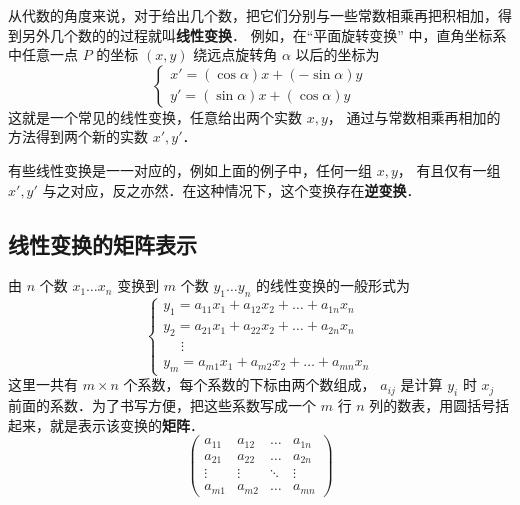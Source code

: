 

从代数的角度来说，对于给出几个数，把它们分别与一些常数相乘再把积相加，得到另外几个数的的过程就叫\textbf{线性变换}． 例如，在“平面旋转变换” 中，直角坐标系中任意一点 $P$ 的坐标 $(x,y)$ 绕远点旋转角 $\alpha $ 以后的坐标为
\begin{equation}\label{LTrans_eq1}
\begin{cases}
x' = (\cos\alpha) x + (-\sin\alpha)y\\
y' = (\sin \alpha)x + (\cos\alpha)y
\end{cases}
\end{equation}
这就是一个常见的线性变换，任意给出两个实数 $x,y$， 通过与常数相乘再相加的方法得到两个新的实数  $x',y'$． 

有些线性变换是一一对应的，例如上面的例子中，任何一组 $x,y$， 有且仅有一组 $x',y'$ 与之对应，反之亦然．在这种情况下，这个变换存在\textbf{逆变换}．

\subsection{线性变换的矩阵表示}

由 $n$ 个数 $x_1 \ldots x_n$ 变换到 $m$ 个数 $y_1 \ldots y_n$ 的线性变换的一般形式为
\begin{equation}
\begin{cases}
y_1 = a_{11} x_1 + a_{12} x_2 + \ldots + a_{1n} x_n\\
y_2 = a_{21} x_1 + a_{22} x_2 + \ldots + a_{2n} x_n\\
\quad\; \vdots \\
y_m = a_{m1} x_1 + a_{m2} x_2 + \ldots + a_{mn} x_n
\end{cases}
\end{equation} 
这里一共有 $m \times n$ 个系数，每个系数的下标由两个数组成， $a_{ij}$ 是计算 $y_i$ 时 $x_j$ 前面的系数．为了书写方便，把这些系数写成一个 $m$ 行 $n$ 列的数表，用圆括号括起来，就是表示该变换的\textbf{矩阵}．
\begin{equation}\begin{pmatrix}
a_{11} & a_{12} & \ldots & a_{1n}\\
a_{21} & a_{22} & \ldots & a_{2n}\\
 \vdots & \vdots & \ddots & \vdots \\
a_{m1} & a_{m2} & \ldots & a_{mn}
\end{pmatrix}\end{equation} 
